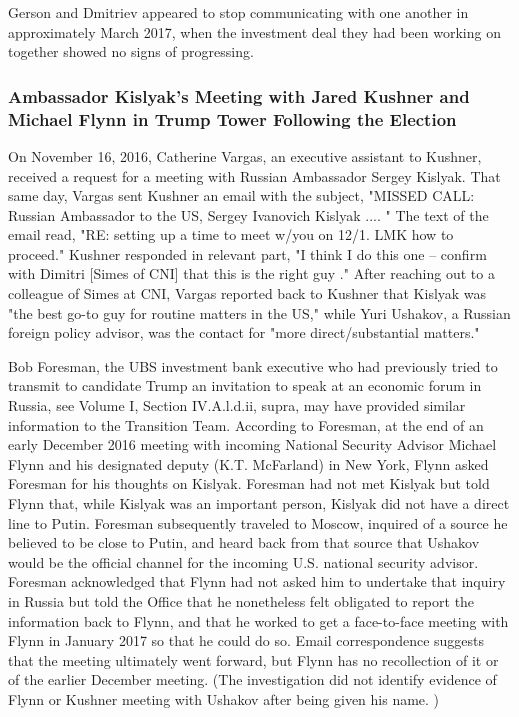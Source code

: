Gerson and Dmitriev appeared to stop communicating with one another in approximately March 2017, when the investment deal they had been working on together showed no signs of progressing.%

\subsubsection{Ambassador Kislyak's Meeting with Jared Kushner and Michael Flynn in Trump Tower Following the Election}

On November 16, 2016, Catherine Vargas, an executive assistant to Kushner, received a request for a meeting with Russian Ambassador Sergey Kislyak.%
That same day, Vargas sent Kushner an email with the subject, "MISSED CALL: Russian Ambassador to the US, Sergey Ivanovich Kislyak .... "%
The text of the email read, "RE: setting up a time to meet w/you on 12/1. LMK how to proceed."
Kushner responded in relevant part, "I think I do this one -- confirm with Dimitri [Simes of CNI] that this is the right guy ."%
After reaching out to a colleague of Simes at CNI, Vargas reported back to Kushner that Kislyak was "the best go-to guy for routine matters in the US," while Yuri Ushakov, a Russian foreign policy advisor, was the contact for "more direct/substantial matters."%

Bob Foresman, the UBS investment bank executive who had previously tried to transmit to candidate Trump an invitation to speak at an economic forum in Russia, see Volume I, Section IV.A.l.d.ii, supra, may have provided similar information to the Transition Team.
According to Foresman, at the end of an early December 2016 meeting with incoming National Security Advisor Michael Flynn and his designated deputy (K.T. McFarland) in New York, Flynn asked Foresman for his thoughts on Kislyak.
Foresman had not met Kislyak but told Flynn that, while Kislyak was an important person, Kislyak did not have a direct line to Putin.%
Foresman subsequently traveled to Moscow, inquired of a source he believed to be close to Putin, and heard back from that source that Ushakov would be the official channel for the incoming U.S. national security advisor.%
Foresman acknowledged that Flynn had not asked him to undertake that inquiry in Russia but told the Office that he nonetheless felt obligated to report the information back to Flynn, and that he worked to get a face-to-face meeting with Flynn in January 2017 so that he could do so.%
Email correspondence suggests that the meeting ultimately went forward,%
but Flynn has no recollection of it or of the earlier December meeting.%
(The investigation did not identify evidence of Flynn or Kushner meeting with Ushakov after being given his name.%
)

